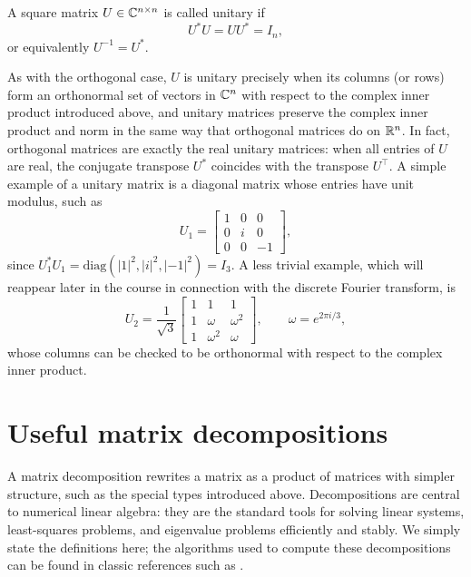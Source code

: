 \begin{definition}
    A square matrix $U \in \mathbb{C}^{n \times n}$ is called unitary if
    \begin{equation*}
        U^* U = U U^* = I_n,
    \end{equation*}
    or equivalently $U^{-1} = U^*$.
\end{definition}
As with the orthogonal case, $U$ is unitary precisely when its columns (or rows) form an orthonormal set of vectors in $\mathbb{C}^n$ with respect to the complex inner product introduced above, and unitary matrices preserve the complex inner product and norm in the same way that orthogonal matrices do on $\mathbb{R}^n$. In fact, orthogonal matrices are exactly the real unitary matrices: when all entries of $U$ are real, the conjugate transpose $U^*$ coincides with the transpose $U^\top$. A simple example of a unitary matrix is a diagonal matrix whose entries have unit modulus, such as
\begin{equation*}
    U_1 = \begin{bmatrix}
        1 & 0 & 0 \\
        0 & i & 0 \\
        0 & 0 & -1
    \end{bmatrix},
\end{equation*}
since $U_1^* U_1 = \mathrm{diag}(|1|^2, |i|^2, |-1|^2) = I_3$. A less trivial example, which will reappear later in the course in connection with the discrete Fourier transform, is
\begin{equation*}
    U_2 = \frac{1}{\sqrt{3}}\begin{bmatrix}
        1 & 1 & 1 \\
        1 & \omega & \omega^2 \\
        1 & \omega^2 & \omega
    \end{bmatrix}, \qquad \omega = e^{2\pi i/3},
\end{equation*}
whose columns can be checked to be orthonormal with respect to the complex inner product.

\section{Useful matrix decompositions}

A matrix decomposition rewrites a matrix as a product of matrices with simpler structure, such as the special types introduced above. Decompositions are central to numerical linear algebra: they are the standard tools for solving linear systems, least-squares problems, and eigenvalue problems efficiently and stably. We simply state the definitions here; the algorithms used to compute these decompositions can be 
found in classic references such as \cite{demmel1997applied,olver2006applied}.

